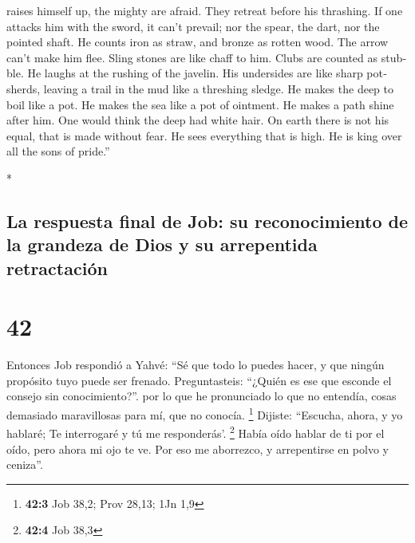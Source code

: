 \begin{paracol}{2}
\begin{otherlanguage}{english}
raises himself up, the mighty are afraid. They retreat before his
thrashing.  If one attacks him with the sword, it can't
prevail; nor the spear, the dart, nor the pointed shaft. 
He counts iron as straw, and bronze as rotten wood.  The
arrow can't make him flee. Sling stones are like chaff to him.
 Clubs are counted as stubble. He laughs at the rushing
of the javelin.  His undersides are like sharp potsherds,
leaving a trail in the mud like a threshing sledge.  He
makes the deep to boil like a pot. He makes the sea like a pot of
ointment.  He makes a path shine after him. One would
think the deep had white hair.  On earth there is not his
equal, that is made without fear.  He sees everything
that is high. He is king over all the sons of pride.''

\end{otherlanguage}

\switchcolumn[0]*

\hypertarget{la-respuesta-final-de-job-su-reconocimiento-de-la-grandeza-de-dios-y-su-arrepentida-retractaciuxf3n}{%
\subsection{La respuesta final de Job: su reconocimiento de la grandeza
de Dios y su arrepentida
retractación}\label{la-respuesta-final-de-job-su-reconocimiento-de-la-grandeza-de-dios-y-su-arrepentida-retractaciuxf3n}}

\hypertarget{section-82}{%
\section{42}\label{section-82}}

 Entonces Job respondió a Yahvé:  ``Sé que
todo lo puedes hacer, y que ningún propósito tuyo puede ser frenado.
 Preguntasteis: ``¿Quién es ese que esconde el consejo sin
conocimiento?''. por lo que he pronunciado lo que no entendía, cosas
demasiado maravillosas para mí, que no conocía. \footnote{\textbf{42:3}
  Job 38,2; Prov 28,13; 1Jn 1,9}  Dijiste: ``Escucha,
ahora, y yo hablaré; Te interrogaré y tú me responderás'. \footnote{\textbf{42:4}
  Job 38,3}  Había oído hablar de ti por el oído, pero
ahora mi ojo te ve.  Por eso me aborrezco, y arrepentirse
en polvo y ceniza''.

\hypertarget{la-condenaciuxf3n-de-dios-a-los-tres-amigos-y-su-perduxf3n-despuuxe9s-del-sacrificio-hecho-por-intercesiuxf3n-de-job}{%
}
\end{paracol}
